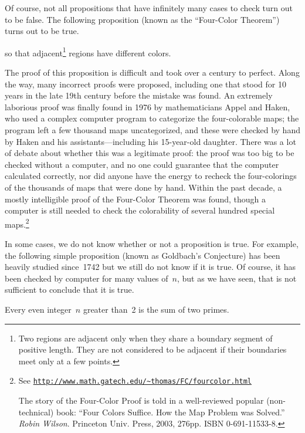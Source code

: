 Of course, not all propositions  that have infinitely many cases to
check turn out to be
false.  The following proposition (known as the ``Four-Color
Theorem'') turns out to be true.
\begin{proposition}\label{4colorprop}
 so that
adjacent\footnote{Two regions are adjacent only when they share a boundary
segment of positive length.  They are not considered to be adjacent if
their boundaries meet only at a few points.} regions have different
colors.
\end{proposition}
The proof of this proposition is difficult and took over a century to
perfect.  Along the way, many incorrect proofs were proposed,
including one that stood for 10 years in the late 19th century before
the mistake was found.  An extremely laborious proof was finally found
in 1976 by mathematicians Appel and Haken, who used a complex computer
program to categorize the four-colorable maps; the program left a few
thousand maps uncategorized, and these were checked by hand by Haken
and his assistants---including his 15-year-old daughter.  There was a
lot of debate about whether this was a legitimate proof: the proof was
too big to be checked without a computer, and no one could guarantee
that the computer calculated correctly, nor did anyone have the energy
to recheck the four-colorings of the thousands of maps that were done by
hand.  Within the past decade, a mostly intelligible proof of the
Four-Color Theorem was found, though a computer is still needed to
check the colorability of several hundred special maps.\footnote{See
\href{http://www.math.gatech.edu/~thomas/FC/fourcolor.html}
{\texttt{http://www.math.gatech.edu/\~{}thomas/FC/fourcolor.html}}

The story of the Four-Color Proof is told in a well-reviewed
  popular (non-technical) book: ``Four Colors Suffice.  How the Map
  Problem was Solved.'' \emph{Robin Wilson}.  Princeton Univ. Press, 2003,
  276pp. ISBN 0-691-11533-8.}

In some cases, we do not know whether or not a proposition is true.
For example, the following simple proposition (known as Goldbach's
Conjecture) has been heavily studied since~1742 but we still do not
know if it is true.  Of course, it has been checked by computer for
many values of~$n$, but as we have seen, that is not sufficient to
conclude that it is true.
\begin{proposition}[Goldbach]
Every even integer~$n$ greater than~2 is the sum of two primes.
\end{proposition}

